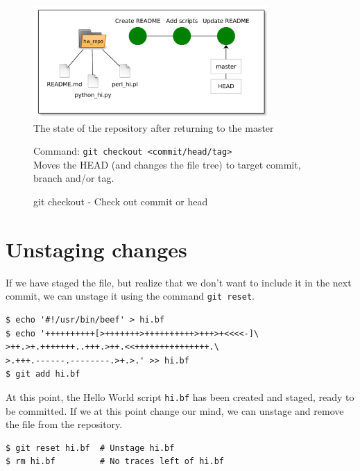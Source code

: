 \documentclass[../main/git_course_main.tex]{subfiles}
\begin{document}
\begin{figure}[h!]
	\centering
	\includegraphics[width=0.8\textwidth]{../visualizations/chapter2/c26_repo_third_commit.pdf}
	\caption{The state of the repository after returning to the master}
	\label{fig:back_to_master}
\end{figure}

\begin{figure}[h!]
\begin{bluebox}
Command: \verb$git checkout <commit/head/tag>$ \\

Moves the HEAD (and changes the file tree) to target commit, branch and/or tag.
\end{bluebox}
\label{command:diff}
\caption{git checkout - Check out commit or head}
\end{figure}

\section{Unstaging changes}

If we have staged the file, but realize that we don't want to include it in the next commit, we can unstage it using the command \verb$git reset$. 

\begin{codebox}
\begin{lstlisting}
$ echo '#!/usr/bin/beef' > hi.bf
$ echo '++++++++++[>+++++++>++++++++++>+++>+<<<<-]\
>++.>+.+++++++..+++.>++.<<+++++++++++++++.\
>.+++.------.--------.>+.>.' >> hi.bf
$ git add hi.bf
\end{lstlisting}
\end{codebox}

At this point, the Hello World script \verb$hi.bf$ has been created and staged, ready to be committed. If we at this point change our mind, we can unstage and remove the file from the repository.

\begin{codebox}
\begin{lstlisting}
$ git reset hi.bf  # Unstage hi.bf
$ rm hi.bf         # No traces left of hi.bf
\end{lstlisting}
\end{codebox}
\end{document}
